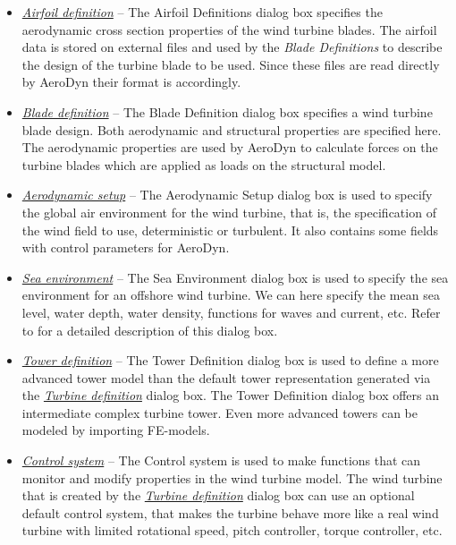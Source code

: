 \begin{itemize}
\item\protect\hyperlink{airfoil-definition}{\sl Airfoil definition} --
  The Airfoil Definitions dialog box specifies the aerodynamic cross section
  properties of the wind turbine blades. The airfoil data is stored on
  external files and used by the {\sl Blade Definitions} to describe
  the design of the turbine blade to be used. Since these files are read
  directly by AeroDyn their format is accordingly.
\item\protect\hyperlink{blade-definition}{\sl Blade definition} --
  The Blade Definition dialog box specifies a wind turbine blade design.
  Both aerodynamic and structural properties are specified here.
  The aerodynamic properties are used by AeroDyn to calculate forces on the
  turbine blades which are applied as loads on the structural model.
\item\protect\hyperlink{aerodynamic-setup}{\sl Aerodynamic setup} --
  The Aerodynamic Setup dialog box is used to specify the global air
  environment for the wind turbine, that is, the specification of the
  wind field to use, deterministic or turbulent. It also contains some
  fields with control parameters for AeroDyn.
\item\protect\hyperlink{sea-environment}{\sl Sea environment} --
  The Sea Environment dialog box is used to specify the sea environment for
  an offshore wind turbine. We can here specify the mean sea level, water depth,
  water density, functions for waves and current, etc.
  Refer to 
  for a detailed description of this dialog box.
\item\protect\hyperlink{tower-definition}{\sl Tower definition} --
  The Tower Definition dialog box is used to define a more advanced tower model
  than the default tower representation generated via the
  \protect\hyperlink{turbine-definition}{\sl Turbine definition} dialog box.
  The Tower Definition dialog box offers an intermediate complex turbine tower.
  Even more advanced towers can be modeled by importing FE-models.
\item\protect\hyperlink{control-system}{\sl Control system} --
  The Control system is used to make functions that can monitor and modify
  properties in the wind turbine model. The wind turbine that is created by the
  \protect\hyperlink{turbine-definition}{\sl Turbine definition} dialog box
  can use an optional default control system, that makes the turbine
  behave more like a real wind turbine with limited rotational speed,
  pitch controller, torque controller, etc.
\end{itemize}


